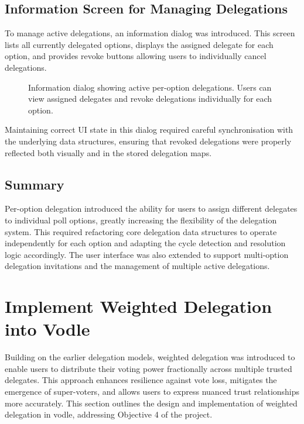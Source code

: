 \subsection{Information Screen for Managing Delegations}

To manage active delegations, an information dialog was introduced. This screen lists all currently delegated options, displays the assigned delegate for each option, and provides revoke buttons allowing users to individually cancel delegations.

\begin{figure}[H]
  \centering
  \caption{Information dialog showing active per-option delegations. Users can view assigned delegates and revoke delegations individually for each option.}
  \label{fig:per-option-delegation-management}
\end{figure}

Maintaining correct UI state in this dialog required careful synchronisation with the underlying data structures, ensuring that revoked delegations were properly reflected both visually and in the stored delegation maps.

\subsection{Summary}

Per-option delegation introduced the ability for users to assign different delegates to individual poll options, greatly increasing the flexibility of the delegation system. This required refactoring core delegation data structures to operate independently for each option and adapting the cycle detection and resolution logic accordingly. The user interface was also extended to support multi-option delegation invitations and the management of multiple active delegations.

\section{Implement Weighted Delegation into Vodle}

Building on the earlier delegation models, weighted delegation was introduced to enable users to distribute their voting power fractionally across multiple trusted delegates. This approach enhances resilience against vote loss, mitigates the emergence of super-voters, and allows users to express nuanced trust relationships more accurately. This section outlines the design and implementation of weighted delegation in vodle, addressing Objective 4 of the project.

